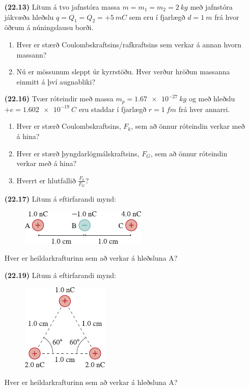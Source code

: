 \begin{enumerate}[label = \textbf{(\alph*)}]
    \item[\textbf{(22.13)}] Lítum á tvo jafnstóra massa $m = m_1 = m_2 = \SI{2}{kg}$ með jafnstóra jákvæða hleðslu $q = Q_1 = Q_2 = +\SI{5}{mC}$ sem eru í fjarlægð $d = \SI{1}{m}$ frá hvor öðrum á núningslausu borði.
    \begin{enumerate}[label = \textbf{(\alph*)}]
        \item Hver er stærð Coulombskraftsins/rafkraftsins sem verkar á annan hvorn massann?
        \item Nú er mössunum sleppt úr kyrrstöðu. Hver verður hröðun massanna einmitt á því augnabliki?
    \end{enumerate}
    
    \item[\textbf{(22.16)}] Tvær róteindir með massa $m_p = \SI{1.67e-27}{kg}$ og með hleðslu $+e = \SI{+1.602e-19}{C}$ eru staddar í fjarlægð $r = \SI{1}{fm}$ frá hver annarri.
    \begin{enumerate}[label = \textbf{(\alph*)}]
        \item Hver er stærð Coulombskraftsins, $F_k$, sem að önnur róteindin verkar með á hina?
        \item Hver er stærð þyngdarlögmálskraftsins, $F_G$, sem að önnur róteindin verkar með á hina?
        \item Hverrt er hlutfallið $\frac{F_k}{F_G}$?
    \end{enumerate}
    
    \item[\textbf{(22.17)}] Lítum á eftirfarandi mynd:
    \begin{figure}[H]
        \centering
        \includegraphics[scale = 1.25]{figures/rk-charges.pdf}
    \end{figure}
    Hver er heildarkrafturinn sem að verkar á hleðsluna A?
    
    \item[\textbf{(22.19)}] Lítum á eftirfarandi mynd:
    \begin{figure}[H]
        \centering
        \includegraphics[scale = 1.25]{figures/rk2219.pdf}
    \end{figure}
    Hver er heildarkrafturinn sem að verkar á hleðsluna A?
\end{enumerate}



